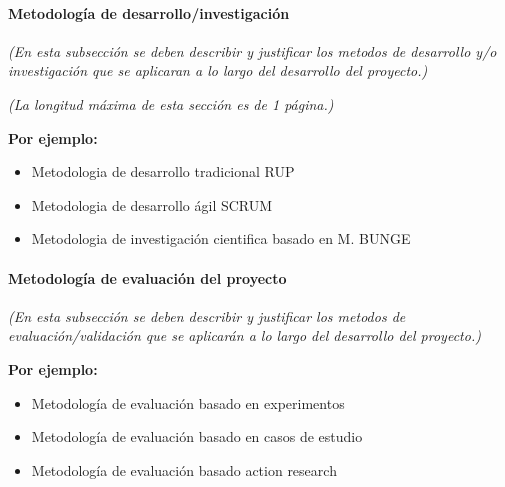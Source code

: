 \documentclass[11pt,letterpaper]{article}
\begin{document}
\subsection{Metodología de desarrollo/investigación}

\emph{(En esta subsección se deben describir y justificar los metodos de desarrollo y/o investigación que se aplicaran a lo largo del desarrollo del proyecto.)}


\emph{(La longitud máxima de esta sección es de 1 página.)}

\textbf{Por ejemplo:}
\begin{itemize}
	\item Metodologia de desarrollo tradicional RUP
	\item Metodologia de desarrollo ágil SCRUM
	\item Metodologia de investigación cientifica basado en M. BUNGE
\end{itemize}

\subsection{Metodología de evaluación del proyecto}
\emph{(En esta subsección se deben describir y justificar los metodos de evaluación/validación que se aplicarán a lo largo del desarrollo del proyecto.)}

\textbf{Por ejemplo:}
\begin{itemize}
	\item Metodología de evaluación basado en experimentos
	\item Metodología de evaluación basado en casos de estudio
		\item Metodología de evaluación basado action research
\end{itemize}

\part{%
%
}
\end{document}
